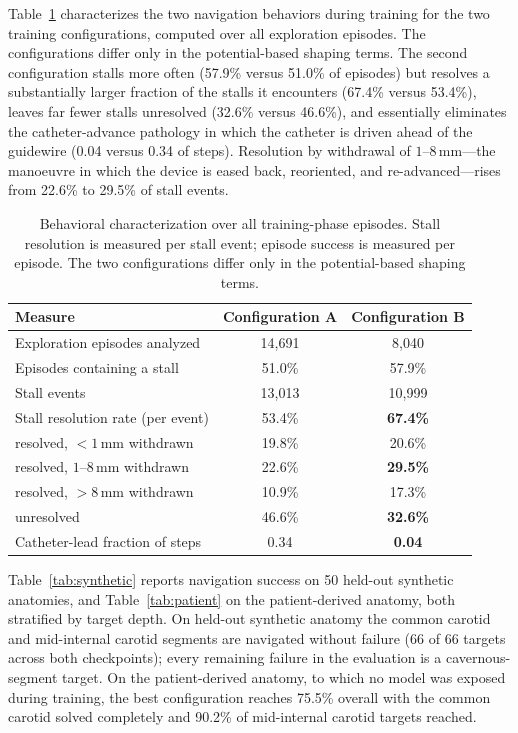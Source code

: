 Table~\ref{tab:behavior} characterizes the two navigation behaviors during training for the two
training configurations, computed over all exploration episodes. The configurations differ only
in the potential-based shaping terms. The second configuration stalls more often (57.9\% versus
51.0\% of episodes) but resolves a substantially larger fraction of the stalls it encounters
(67.4\% versus 53.4\%), leaves far fewer stalls unresolved (32.6\% versus 46.6\%), and
essentially eliminates the catheter-advance pathology in which the catheter is driven ahead of
the guidewire (0.04 versus 0.34 of steps). Resolution by withdrawal of $1$--$8$\,mm---the
manoeuvre in which the device is eased back, reoriented, and re-advanced---rises from 22.6\% to
29.5\% of stall events.

\begin{table}[ht]
\caption{Behavioral characterization over all training-phase episodes. Stall resolution is
measured per stall event; episode success is measured per episode. The two configurations differ
only in the potential-based shaping terms.}
\label{tab:behavior}
\begin{center}
\begin{tabular}{lcc}
\toprule
Measure & Configuration A & Configuration B \\
\midrule
Exploration episodes analyzed          & 14{,}691 & 8{,}040 \\
Episodes containing a stall            & 51.0\%   & 57.9\%  \\
Stall events                           & 13{,}013 & 10{,}999 \\
Stall resolution rate (per event)      & 53.4\%   & \textbf{67.4\%} \\
\quad resolved, ${<}1$\,mm withdrawn   & 19.8\%   & 20.6\%  \\
\quad resolved, $1$--$8$\,mm withdrawn & 22.6\%   & \textbf{29.5\%} \\
\quad resolved, ${>}8$\,mm withdrawn   & 10.9\%   & 17.3\%  \\
\quad unresolved                       & 46.6\%   & \textbf{32.6\%} \\
Catheter-lead fraction of steps        & 0.34     & \textbf{0.04} \\
\bottomrule
\end{tabular}
\end{center}
\end{table}

Table~\ref{tab:synthetic} reports navigation success on 50 held-out synthetic anatomies, and
Table~\ref{tab:patient} on the patient-derived anatomy, both stratified by target depth. On
held-out synthetic anatomy the common carotid and mid-internal carotid segments are navigated
without failure (66 of 66 targets across both checkpoints); every remaining failure in the
evaluation is a cavernous-segment target. On the patient-derived anatomy, to which no model was
exposed during training, the best configuration reaches 75.5\% overall with the common carotid
solved completely and 90.2\% of mid-internal carotid targets reached.


